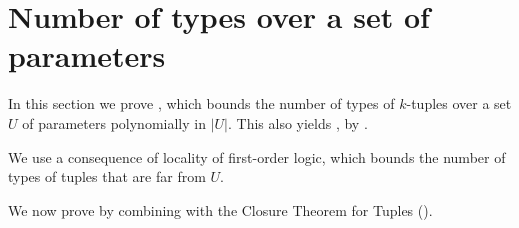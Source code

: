 
\section{Number of types over a set of parameters}\label{sec:types-over-sets}
In this section we prove , which bounds the number of types of $k$-tuples over a set $U$ of parameters polynomially in $|U|$. This also yields , by .

We use a consequence of locality of first-order logic, which bounds the number of types of tuples that are far from $U$. 



We now prove  by combining  with the Closure Theorem for Tuples ().



{\typeboundgeneraltrue\dpmintypes*}

